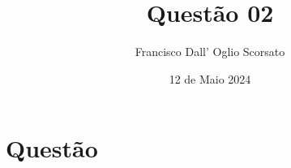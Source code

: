 \documentclass{article}
\title{Questão 02}
\author{Francisco Dall' Oglio Scorsato}
\date{12 de Maio 2024}
\begin{document}
\maketitle

\section{Questão}
\end{document}
